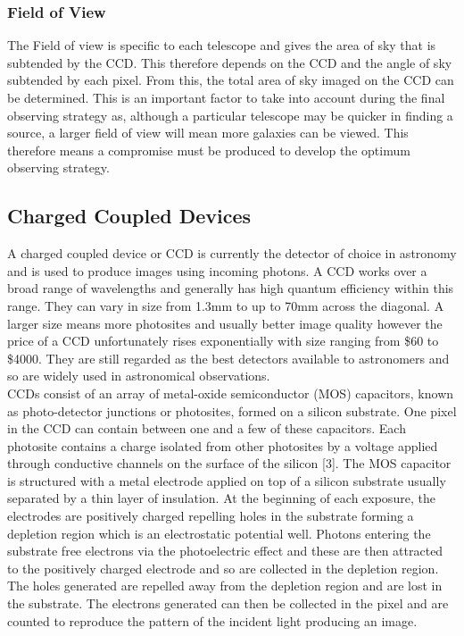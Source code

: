 \documentclass[pdf,color]{UoBnote}
\begin{document}
\subsubsection{Field of View}
The Field of view is specific to each telescope and gives the area of sky that is subtended by the CCD. This therefore depends on the CCD and the angle of sky subtended by each pixel. From this, the total area of sky imaged on the CCD can be determined. This is an important factor to take into account during the final observing strategy as, although a particular telescope may be quicker in finding a source, a larger field of view will mean more galaxies can be viewed. This therefore means a compromise must be produced to develop the optimum observing strategy.\\

\subsection{Charged Coupled Devices}
A charged coupled device or CCD is currently the detector of choice in astronomy and is used to produce images using incoming photons. A CCD works over a broad range of wavelengths and generally has high quantum efficiency within this range. They can vary in size from 1.3mm to up to 70mm across the diagonal. A larger size means more photosites and usually better image quality however the price of a CCD unfortunately rises exponentially with size ranging from \$60 to \$4000. They are still regarded as the best detectors available to astronomers and so are widely used in astronomical observations.\\
\newline
CCDs consist of an array of metal-oxide semiconductor (MOS) capacitors, known as photo-detector junctions or photosites, formed on a silicon substrate. One pixel in the CCD can contain between one and a few of these capacitors. Each photosite contains a charge isolated from other photosites by a voltage applied through conductive channels on the surface of the silicon [3]. The MOS capacitor is structured with a metal electrode applied on top of a silicon substrate usually separated by a thin layer of insulation. At the beginning of each exposure, the electrodes are positively charged repelling holes in the substrate forming a depletion region which is an electrostatic potential well. Photons entering the substrate free electrons via the photoelectric effect and these are then attracted to the positively charged electrode and so are collected in the depletion region. The holes generated are repelled away from the depletion region and are lost in the substrate. The electrons generated can then be collected in the pixel and are counted to reproduce the pattern of the incident light producing an image.\\
\end{document}
